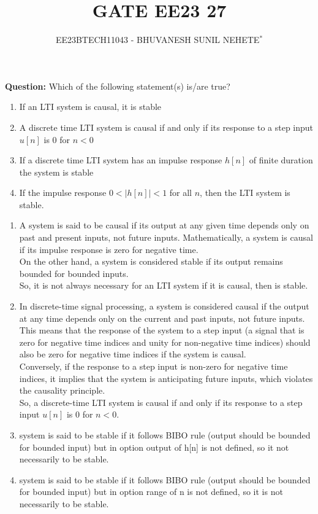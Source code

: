 \documentclass[journal,12pt,twocolumn]{IEEEtran}
\theoremstyle{remark}
\begin{document}

\vspace{3cm}

\title{GATE EE23 27}
\author{EE23BTECH11043 - BHUVANESH SUNIL NEHETE$^{*}$%
}
\maketitle
\newpage
\bigskip

\renewcommand{\thefigure}{\theenumi}
\renewcommand{\thetable}{\theenumi}



\textbf{Question:}
Which of the following statement(s) is/are true?
\begin{enumerate}[label=\alph*)]
    \item If an LTI system is causal, it is stable
    \item A discrete time LTI system is causal if and only if its response to a step input $u[n]$ is 0 for $n < 0$
    \item If a discrete time LTI system has an impulse response $h[n]$ of finite duration the system is stable
    \item If the impulse response $0<|h[n]|<1$ for all $n$, then the LTI system is stable.
\end{enumerate}

\solution
\begin{enumerate}
    \item A system is said to be causal if its output at any given time depends only on past and present inputs, not future inputs. Mathematically, a system is causal if its impulse response is zero for negative time.\\
    On the other hand, a system is considered stable if its output remains bounded for bounded inputs.\\
    So, it is not always necessary for an LTI system if it is causal, then is stable.
    \item In discrete-time signal processing, a system is considered causal if the output at any time depends only on the current and past inputs, not future inputs. This means that the response of the system to a step input (a signal that is zero for negative time indices and unity for non-negative time indices) should also be zero for negative time indices if the system is causal.\\
    Conversely, if the response to a step input is non-zero for negative time indices, it implies that the system is anticipating future inputs, which violates the causality principle.\\
    So, a discrete-time LTI system is causal if and only if its response to a step input $u[n]$ is 0 for $n<0$.
    \item system is said to be stable if it follows BIBO rule (output should be bounded for bounded input) but in option  output of h[n] is not defined, so it not necessarily to be stable.
    \item system is said to be stable if it follows BIBO rule (output should be bounded for bounded input) but in option  range of n is not defined, so it is not necessarily to be stable.
\end{enumerate}
\end{document}
